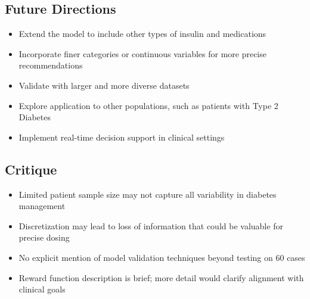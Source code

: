 \subsection*{Future Directions}
\begin{itemize}
    \item Extend the model to include other types of insulin and medications
    \item Incorporate finer categories or continuous variables for more precise recommendations
    \item Validate with larger and more diverse datasets
    \item Explore application to other populations, such as patients with Type 2 Diabetes
    \item Implement real-time decision support in clinical settings
\end{itemize}

\subsection*{Critique}
\begin{itemize}
    \item Limited patient sample size may not capture all variability in diabetes management
    \item Discretization may lead to loss of information that could be valuable for precise dosing
    \item No explicit mention of model validation techniques beyond testing on 60 cases
    \item Reward function description is brief; more detail would clarify alignment with clinical goals
\end{itemize}



